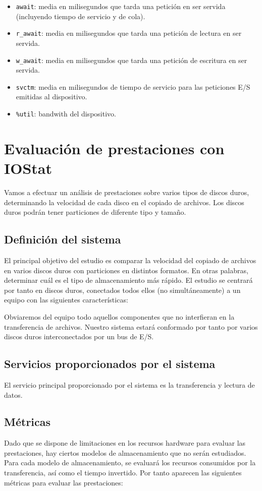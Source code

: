 \documentclass[a4paper,10pt]{article}
\begin{document}
\begin{itemize}
 \item{\texttt{await}}: media en milisegundos que tarda una petición en ser servida (incluyendo tiempo de servicio y de cola).
 \item{\texttt{r\_await}}: media en milisegundos que tarda una petición de lectura en ser servida.
 \item{\texttt{w\_await}}: media en milisegundos que tarda una petición de escritura en ser servida.
 \item{\texttt{svctm}}: media en milisegundos de tiempo de servicio para las peticiones E/S emitidas al dispositivo.
 \item{\texttt{\%util}}: bandwith del dispositivo.
\end{itemize}

\section{Evaluación de prestaciones con IOStat}
Vamos a efectuar un análisis de prestaciones sobre varios tipos de discos duros, determinando la velocidad de cada 
disco en el copiado de archivos. Los discos duros podrán tener particiones de diferente tipo y tamaño.

\subsection{Definición del sistema}
El principal objetivo del estudio es comparar la velocidad del copiado de archivos en varios discos duros con particiones
en distintos formatos. En otras palabras, determinar cuál es el tipo de almacenamiento más rápido. El estudio se centrará
por tanto en discos duros, conectados todos ellos (no simultáneamente) a un equipo con las siguientes características:


Obviaremos del equipo todo aquellos componentes que no interfieran en la transferencia de archivos. Nuestro sistema estará
conformado por tanto por varios discos duros interconectados por un bus de E/S.

\subsection{Servicios proporcionados por el sistema}
El servicio principal proporcionado por el sistema es la transferencia y lectura de datos.

\subsection{Métricas}
Dado que se dispone de limitaciones en los recursos hardware para evaluar las prestaciones, hay ciertos modelos de almacenamiento
que no serán estudiados. Para cada modelo de almacenamiento, se evaluará los recursos consumidos por la transferencia, así
como el tiempo invertido. Por tanto aparecen las siguientes métricas para evaluar las prestaciones:
\end{document}
